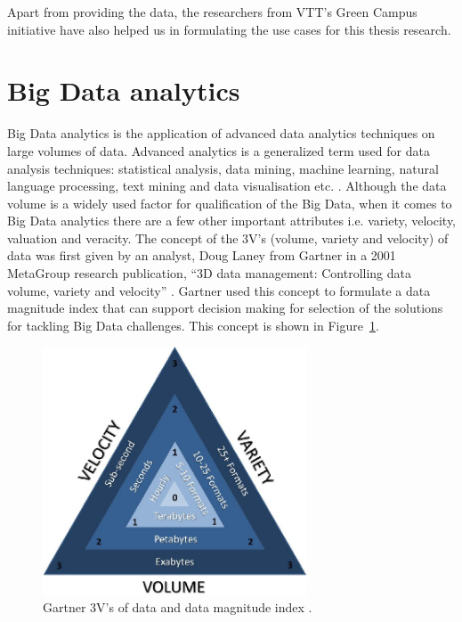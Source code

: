 Apart from providing the data, the researchers from VTT's Green Campus initiative have also helped us in formulating the use cases for this thesis research.


\section{Big Data analytics} \label{big_data_analytics}

Big Data analytics is the application of advanced data analytics techniques on large volumes of data. Advanced analytics is a generalized term used for data analysis techniques: statistical analysis, data mining, machine learning, natural language processing, text mining and data visualisation etc. \cite{russom2011big}. Although the data volume is a widely used factor for qualification of the Big Data, when it comes to Big Data analytics there are a few other important attributes i.e. variety, velocity, valuation and veracity. The concept of the 3V's (volume, variety and velocity) of data was first given by an analyst, Doug Laney from Gartner  in a 2001 MetaGroup research publication, ``3D data management: Controlling data volume, variety and velocity'' \cite{laney20013d}.  Gartner used this concept to formulate a data magnitude index that can support decision making for selection of the solutions for tackling Big Data challenges. This concept is shown in Figure~\ref{fig:3Vs}.

\begin{figure}[ht]
  \begin{center}
    \includegraphics[width=0.7\textwidth]{images/3Vs.png}
    \caption{Gartner 3V's of data and data magnitude index \cite{laney20013d}.}
    \label{fig:3Vs}
  \end{center}
\end{figure}


